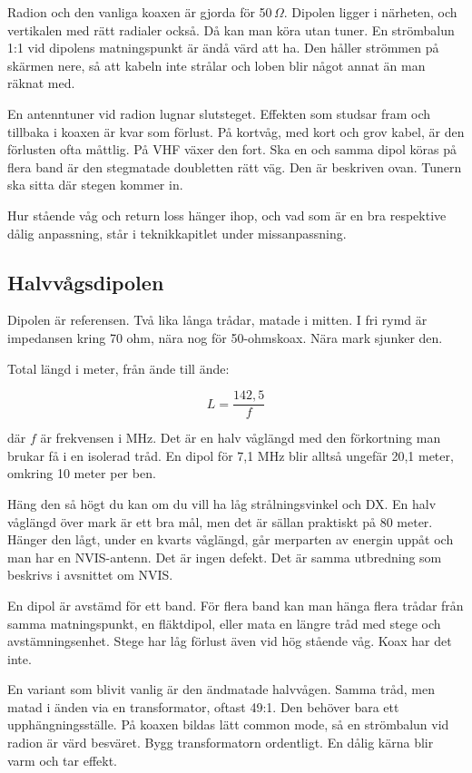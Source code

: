 Radion och den vanliga koaxen är gjorda för 50\,$\Omega$. Dipolen
ligger i närheten, och vertikalen med rätt radialer också. Då kan man
köra utan tuner. En strömbalun 1:1 vid dipolens matningspunkt är ändå
värd att ha. Den håller strömmen på skärmen nere, så att kabeln inte
strålar och loben blir något annat än man räknat med.

En antenntuner vid radion lugnar slutsteget. Effekten som studsar fram
och tillbaka i koaxen är kvar som förlust. På kortvåg, med kort och
grov kabel, är den förlusten ofta måttlig. På VHF växer den fort. Ska
en och samma dipol köras på flera band är den stegmatade doubletten
rätt väg.  Den är beskriven ovan. Tunern ska sitta där stegen kommer
in.

Hur stående våg och return loss hänger ihop, och vad som är en bra
respektive dålig anpassning, står i teknikkapitlet under
missanpassning.

\subsection{Halvvågsdipolen}

Dipolen är referensen. Två lika långa trådar, matade i mitten. I fri rymd
är impedansen kring 70 ohm, nära nog för 50-ohmskoax. Nära mark sjunker den.

Total längd i meter, från ände till ände:

\begin{equation}
	L = \frac{142,5}{f}
\end{equation}

där $f$ är frekvensen i MHz. Det är en halv våglängd med den förkortning
man brukar få i en isolerad tråd. En dipol för 7,1 MHz blir alltså ungefär
20,1 meter, omkring 10 meter per ben.

Häng den så högt du kan om du vill ha låg strålningsvinkel och DX. En halv
våglängd över mark är ett bra mål, men det är sällan praktiskt på 80 meter.
Hänger den lågt, under en kvarts våglängd, går merparten av energin uppåt
och man har en NVIS-antenn. Det är ingen defekt. Det är samma utbredning
som beskrivs i avsnittet om NVIS.

En dipol är avstämd för ett band. För flera band kan man hänga flera trådar
från samma matningspunkt, en fläktdipol, eller mata en längre tråd med stege
och avstämningsenhet. Stege har låg förlust även vid hög stående våg. Koax
har det inte.

En variant som blivit vanlig är den ändmatade halvvågen. Samma tråd, men
matad i änden via en transformator, oftast 49:1. Den behöver bara ett
upphängningsställe. På koaxen bildas lätt common mode, så en strömbalun vid
radion är värd besväret. Bygg transformatorn ordentligt. En dålig kärna
blir varm och tar effekt.

